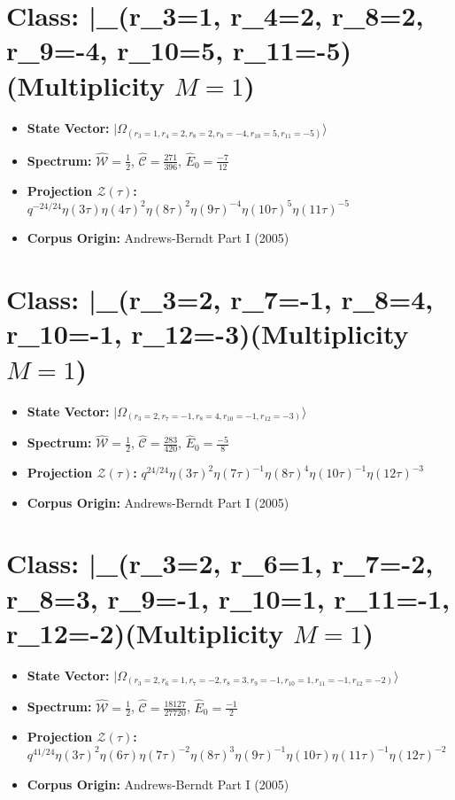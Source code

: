 \documentclass[11pt,twoside,openright]{book}
\begin{document}
\section*{Class: |\Omega_{(r_{3}=1, r_{4}=2, r_{8}=2, r_{9}=-4, r_{10}=5, r_{11}=-5)}\rangle (Multiplicity $M=1$)}
\begin{itemize}
  \item \textbf{State Vector:} $|\Omega_{(r_{3}=1, r_{4}=2, r_{8}=2, r_{9}=-4, r_{10}=5, r_{11}=-5)}\rangle$
  \item \textbf{Spectrum:} $\hat{\mathcal{W}} = \frac{1}{2}$, $\hat{\mathcal{C}} = \frac{271}{396}$, $\hat{E}_0 = \frac{-7}{12}$
  \item \textbf{Projection $\mathcal{Z}(\tau)$:} $q^{-24/24} \eta(3\tau) \eta(4\tau)^{2} \eta(8\tau)^{2} \eta(9\tau)^{-4} \eta(10\tau)^{5} \eta(11\tau)^{-5}$
  \item \textbf{Corpus Origin:} Andrews-Berndt Part I (2005)
\end{itemize}

\section*{Class: |\Omega_{(r_{3}=2, r_{7}=-1, r_{8}=4, r_{10}=-1, r_{12}=-3)}\rangle (Multiplicity $M=1$)}
\begin{itemize}
  \item \textbf{State Vector:} $|\Omega_{(r_{3}=2, r_{7}=-1, r_{8}=4, r_{10}=-1, r_{12}=-3)}\rangle$
  \item \textbf{Spectrum:} $\hat{\mathcal{W}} = \frac{1}{2}$, $\hat{\mathcal{C}} = \frac{283}{420}$, $\hat{E}_0 = \frac{-5}{8}$
  \item \textbf{Projection $\mathcal{Z}(\tau)$:} $q^{24/24} \eta(3\tau)^{2} \eta(7\tau)^{-1} \eta(8\tau)^{4} \eta(10\tau)^{-1} \eta(12\tau)^{-3}$
  \item \textbf{Corpus Origin:} Andrews-Berndt Part I (2005)
\end{itemize}

\section*{Class: |\Omega_{(r_{3}=2, r_{6}=1, r_{7}=-2, r_{8}=3, r_{9}=-1, r_{10}=1, r_{11}=-1, r_{12}=-2)}\rangle (Multiplicity $M=1$)}
\begin{itemize}
  \item \textbf{State Vector:} $|\Omega_{(r_{3}=2, r_{6}=1, r_{7}=-2, r_{8}=3, r_{9}=-1, r_{10}=1, r_{11}=-1, r_{12}=-2)}\rangle$
  \item \textbf{Spectrum:} $\hat{\mathcal{W}} = \frac{1}{2}$, $\hat{\mathcal{C}} = \frac{18127}{27720}$, $\hat{E}_0 = \frac{-1}{2}$
  \item \textbf{Projection $\mathcal{Z}(\tau)$:} $q^{41/24} \eta(3\tau)^{2} \eta(6\tau) \eta(7\tau)^{-2} \eta(8\tau)^{3} \eta(9\tau)^{-1} \eta(10\tau) \eta(11\tau)^{-1} \eta(12\tau)^{-2}$
  \item \textbf{Corpus Origin:} Andrews-Berndt Part I (2005)
\end{itemize}
\end{document}

